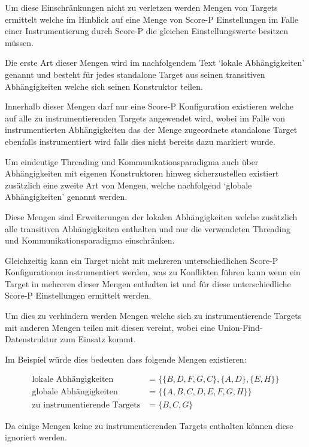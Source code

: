 \documentclass[german,proseminar,hyperref,utf8]{zihpub}
\begin{document}
    Um diese Einschränkungen nicht zu verletzen werden Mengen von Targets ermittelt welche im
    Hinblick auf eine Menge von Score-P Einstellungen im Falle einer Instrumentierung durch
    Score-P die gleichen Einstellungswerte besitzen müssen.

    Die erste Art dieser Mengen wird im nachfolgendem Text `lokale Abhängigkeiten' genannt und
    besteht für jedes standalone Target aus seinen transitiven Abhängigkeiten welche sich
    seinen Konstruktor teilen.

    Innerhalb dieser Mengen darf nur eine Score-P Konfiguration existieren welche auf alle zu
    instrumentierenden Targets angewendet wird, wobei im Falle von instrumentierten Abhängigkeiten
    das der Menge zugeordnete standalone Target ebenfalls instrumentiert wird falls dies nicht
    bereits dazu markiert wurde.

    Um eindeutige Threading und Kommunikationsparadigma auch über Abhängigkeiten mit eigenen
    Konstruktoren hinweg sicherzustellen existiert zusätzlich eine zweite Art von Mengen, welche
    nachfolgend `globale Abhängigkeiten' genannt werden.

    Diese Mengen sind Erweiterungen der lokalen Abhängigkeiten welche zusätzlich alle transitiven
    Abhängigkeiten enthalten und nur die verwendeten Threading und Kommunikationsparadigma einschränken.

    Gleichzeitig kann ein Target nicht mit mehreren unterschiedlichen Score-P Konfigurationen
    instrumentiert werden, was zu Konflikten führen kann wenn ein Target in mehreren dieser
    Mengen enthalten ist und für diese unterschiedliche Score-P Einstellungen ermittelt werden.

    Um dies zu verhindern werden Mengen welche sich zu instrumentierende Targets mit anderen
    Mengen teilen mit diesen vereint, wobei eine Union-Find-Datenstruktur zum Einsatz kommt.
    
    Im Beispiel würde dies bedeuten dass folgende Mengen existieren:

    \begin{align*}
        \text{lokale Abhängigkeiten} &= \{ \{ B, D, F, G, C \}, \{ A, D \}, \{ E, H \} \} \\
        \text{globale Abhängigkeiten} &= \{ \{ A, B, C, D, E, F, G, H \} \} \\
        \text{zu instrumentierende Targets} &= \{ B, C, G \}
    \end{align*}

    Da einige Mengen keine zu instrumentierenden Targets enthalten können diese ignoriert werden.
\end{document}
